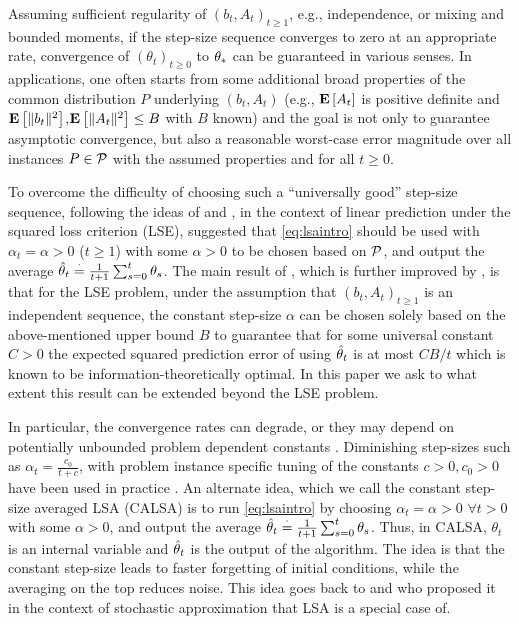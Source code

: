 Assuming sufficient regularity of $(b_t,A_t)_{t\ge 1}$, e.g., independence, or mixing
and bounded moments, if the step-size sequence converges to zero at an appropriate rate,
convergence of $(\theta_t)_{t\ge 0}$ to $\theta_*$ can be guaranteed in various senses. 
In applications, 
one often starts from some additional broad properties of the common distribution
$P$ underlying $(b_t,A_t)$ (e.g., $\mathbf{E}\left[A_t\right]$ is positive definite and $\mathbf{E}\left[\| b_t\|^2\right]$,$\mathbf{E}\left[\| A_t\|^2\right]\le B$ with $B$ known) and the goal is not only to guarantee asymptotic convergence, but also a reasonable worst-case error magnitude over all instances $P\in \mathcal{P}$ 
with the assumed properties and for all $t\ge 0$. 

To overcome the difficulty of choosing such a ``universally good'' step-size sequence,
following the ideas of \citet{ruppert} and \citet{polyak-judisky},
in the context of linear prediction under the squared loss criterion (LSE),
\citet{bach-moulines} suggested that
\eqref{eq:lsaintro} should be used with $\alpha_t=\alpha>0$ ($t\ge 1$) 
with some $\alpha>0$ to be chosen based on $\mathcal{P}$, 
and output the average $\hat{\theta}_t\stackrel{\cdot}{=}\frac{1}{t+1}\sum_{s=0}^t \theta_s$. 
The main result of 
\citet{bach-moulines}, which is further improved
by  \citet{bach}, is that for the LSE problem, under the assumption that $(b_t,A_t)_{t\ge 1}$ is an independent sequence, the constant step-size $\alpha$ can be chosen solely based on the above-mentioned upper bound $B$ to guarantee that 
for some universal constant $C>0$
the expected squared prediction error of using $\hat{\theta}_t$ is at most $C B/t$ 
which is known to be information-theoretically optimal.
In this paper we ask to what extent this result can be extended beyond the LSE problem.

In particular, the convergence rates can degrade, or they may depend on potentially unbounded problem dependent constants \cite{bach-moulines}. Diminishing step-sizes such as $\alpha_t=\frac{c_0}{t+c}$, with problem instance specific tuning of the constants $c>0,c_0>0$ have been used in practice \cite{gtd2,gtdmp,konda-tsitsiklis}. 
An alternate idea, which we call the constant step-size averaged LSA (CALSA) is to run \eqref{eq:lsaintro} by choosing $\alpha_t=\alpha>0$ $\forall t> 0$ with some $\alpha>0$, and output the average $\hat{\theta}_t\stackrel{\cdot}{=}\frac{1}{t+1}\sum_{s=0}^t \theta_s$. Thus, in CALSA, $\theta_t$ is an internal variable and $\hat{\theta}_t$ is the output of the algorithm. The idea is that the constant step-size leads to faster forgetting of initial conditions, while the averaging on the top reduces noise. This idea goes back to  \citet{ruppert} and \citet{polyak-judisky} who proposed it in the context of stochastic approximation that LSA is a special case of.   
\fi

